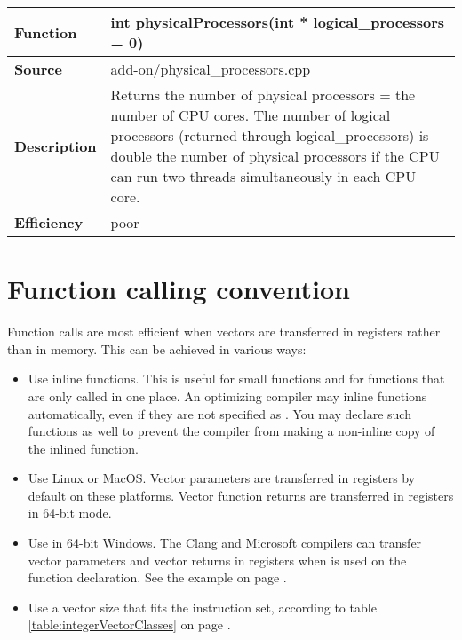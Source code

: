 \documentclass[vcl_manual.tex]{subfiles}
\begin{document}
\label{physicalProcessors}
\begin{tabular}{|p{25mm}|p{100mm}|}
\hline
\bfseries Function & int physicalProcessors(int * logical\_processors = 0) \\ \hline
\bfseries Source & add-on/physical\_processors.cpp \\ \hline
\bfseries Description & Returns the number of physical processors = the number of 
CPU cores. The number of logical processors (returned through 
logical\_processors) is double the number of physical processors if the CPU can run two threads simultaneously in each CPU core. \\ \hline
 \bfseries Efficiency & poor \\ \hline
\end{tabular}


\section{Function calling convention}\label{FunctionCallingConvention}
Function calls are most efficient when vectors are transferred in registers rather than in memory. This can be achieved in various ways:

\begin{itemize}
\item Use inline functions. This is useful for small functions and for functions that are only called in one place. An optimizing compiler may inline functions automatically, even if they are not specified as . You may declare such functions  as well to prevent the compiler from making a non-inline copy of the inlined function.

\item Use Linux or MacOS. Vector parameters are transferred in registers by default on these platforms. Vector function returns are transferred in registers in 64-bit mode.

\item Use  in 64-bit Windows. The Clang and Microsoft compilers can transfer vector parameters and vector returns in registers when  is used on the function declaration. See the example on page \pageref{examplePolynomialVectorcall}.

\item Use a vector size that fits the instruction set, according to table \ref{table:integerVectorClasses} on page \pageref{table:integerVectorClasses}.

\end{itemize}
\end{document}
